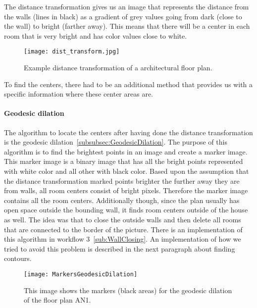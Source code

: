 The distance transformation gives us an image that represents the distance from the walls (lines in black) as a gradient of grey values going from dark (close to the wall) to bright (farther away). This means that there will be a center in each room that is very bright and has color values close to white.

\begin{figure}[H]
	\centering
	\texttt{[image: dist\_transform.jpg]}
	\caption{Example distance transformation of a architectural floor plan.}
	\label{fig:dist_transform}
\end{figure}

To find the centers, there had to be an additional method that provides us with a specific information where these center areas are.

\paragraph{Geodesic dilation}
\label{sub:GeodesicDilation}
The algorithm to locate the centers after having done the distance transformation is the geodesic dilation~\ref{subsubsec:GeodesicDilation}. The purpose of this algorithm is to find the brightest points in an image and create a marker image. This marker image is a binary image that has all the bright points represented with white color and all other with black color. Based upon the assumption that the distance transformation marked points brighter the further away they are from walls, all room centers consist of bright pixels. Therefore the marker image contains all the room centers. Additionally though, since the plan usually has open space outside the bounding wall, it finds room centers outside of the house as well. The idea was that to close the outside walls and then delete all rooms that are connected to the border of the picture. There is an implementation of this algorithm in workflow 3~\ref{sub:WallClosing}. An implementation of how we tried to avoid this problem is described in the next paragraph about finding contours.

\begin{figure}[H]
	\centering
	\texttt{[image: MarkersGeodesicDilation]}
	\caption{This image shows the markers (black areas) for the geodesic dilation of the floor plan AN1.}
	\label{fig:geodesicDilation}
\end{figure}

